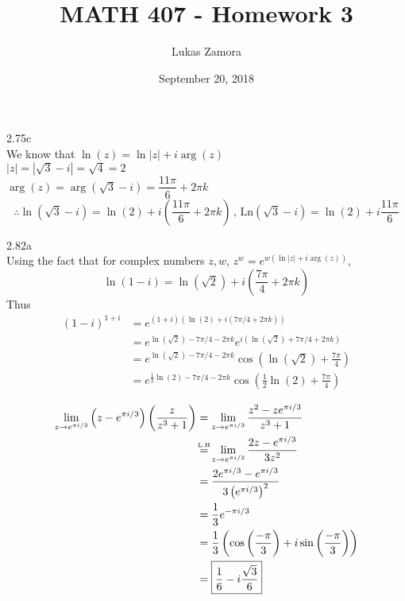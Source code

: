 \documentclass{article}
\title{MATH 407 - Homework 3}
\author{Lukas Zamora}
\date{September 20, 2018}
\newcommand\myeq{\stackrel{\mathclap{\normalfont\mbox{\normalfont\tiny L.H}}}{=}}
\theoremstyle{definition}
\begin{document}
    \maketitle
    
    \begin{prob}{2.75c} $  $ \vspace{1mm} \\
    	We know that $ \ln(z) = \ln|z| + i\arg(z) $ \\
    	
    	$ |z| = |\sqrt{3}-i| = \sqrt{4} = 2 $ \\ 
    	
    	$ \arg(z) = \arg(\sqrt{3}-i) = \dfrac{11\pi}{6} + 2\pi k $ \\
    	
    	$$ \therefore \boxed{ \ln(\sqrt{3} - i) = \ln(2) + i\left(\frac{11\pi}{6} + 2\pi k\right) \, , \,  \text{Ln}(\sqrt{3}-i) = \ln(2) + i\frac{11\pi}{6} } $$
    \end{prob}

	\begin{prob}{2.82a} $  $ \vspace{1mm} \\
		Using the fact that for complex numbers $ z,w $, $ z^w = e^{w(\ln|z| + i\arg(z))} $,
		\[
			\ln(1-i) = \ln(\sqrt{2}) + i\left( \frac{7\pi}{4} + 2\pi k \right)
		\]
		Thus 
		\begin{align*}
			(1-i)^{1+i} &= e^{(1+i)(\ln(2) + i(7\pi/4 + 2\pi k))} \\
			&= e^{\ln(\sqrt{2}) - 7\pi/4 - 2\pi k} e^{i(\ln(\sqrt{2}) + 7\pi/4 + 2\pi k)} \\
			&= e^{\ln(\sqrt{2}) - 7\pi/4 - 2\pi k} \cos\left(\ln(\sqrt{2}) + \frac{7\pi}{4} \right) \\
			&= \boxed{ e^{\frac{1}{2} \ln(2) - 7\pi/4 - 2\pi k} \cos\left(\frac{1}{2}\ln(2) + \frac{7\pi}{4} \right) }
		\end{align*}
	\end{prob}
    
    
    \begin{prob}{2.95}
    	\begin{align*}
    		\lim\limits_{z \to e^{\pi i/3}} \left(z-e^{\pi i/3} \right) \left( \frac{z}{z^3+1} \right) &= \lim\limits_{z \to e^{\pi i/3}} \frac{z^2 - ze^{\pi i/3}}{z^3 + 1} \\
    		&\myeq \lim\limits_{z \to e^{\pi i/3}} \frac{2z - e^{\pi i/3} }{3z^2} \\
    		&= \frac{2e^{\pi i/3} - e^{\pi i/3}}{3\left( e^{\pi i/3} \right)^2} \\
    		&= \frac{1}{3}e^{-\pi i/3} \\
    		&= \frac{1}{3} \left( \cos\left( \frac{-\pi}{3} \right) + i\sin\left( \frac{-\pi}{3}\right) \right) \\
    		&= \boxed{ \frac{1}{6} - i\frac{\sqrt{3}}{6} }
    	\end{align*}
    \end{prob}
    
\end{document}
